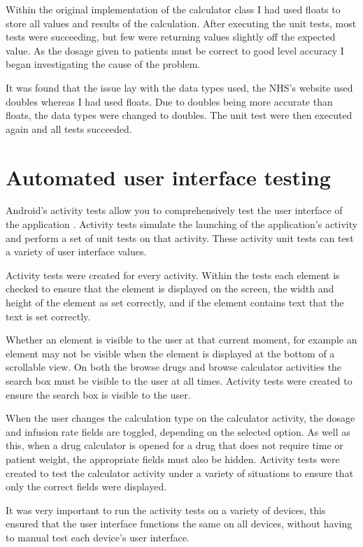 Within the original implementation of the calculator class I had used floats to store all values and results of the calculation. After executing the unit tests, most tests were succeeding, but few were returning values slightly off the expected value. As the dosage given to patients must be correct to good level accuracy I began investigating the cause of the problem. 

It was found that the issue lay with the data types used, the NHS’s website \cite{medusa} used doubles whereas I had used floats. Due to doubles being more accurate than floats, the data types were changed to doubles. The unit test were then executed again and all tests succeeded. 


\section{Automated user interface testing}

Android’s activity tests allow you to comprehensively test the user interface of the application \cite{activity_test}. Activity tests simulate the launching of the application’s activity \cite{activity_test} and perform a set of unit tests on that activity. These activity unit tests can test a variety of user interface values.

Activity tests were created for every activity. Within the tests each element is checked to ensure that the element is displayed on the screen, the width and height of the element as set correctly, and if the element contains text that the text is set correctly.

Whether an element is visible to the user at that current moment, for example an element may not be visible when the element is displayed at the bottom of a scrollable view. On both the browse drugs and browse calculator activities the search box must be visible to the user at all times. Activity tests were created to ensure the search box is visible to the user.

When the user changes the calculation type on the calculator activity, the dosage and infusion rate fields are toggled, depending on the selected option. As well as this, when a drug calculator is opened for a drug that does not require time or patient weight, the appropriate fields must also be hidden. Activity tests \cite{activity_test} were created to test the calculator activity under a variety of situations to ensure that only the correct fields were displayed.

It was very important to run the activity tests on a variety of devices, this ensured that the user interface functions the same on all devices, without having to manual test each device’s user interface.


